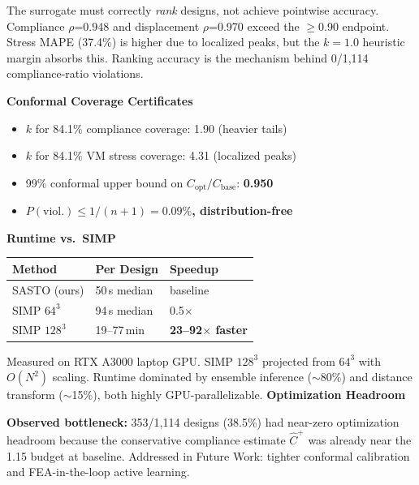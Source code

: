 \documentclass[10pt]{article}
\newenvironment{ccard}{%
  \begin{tcolorbox}[
    colback=cardfill, colframe=cardbdr,
    boxrule=0.5pt, arc=4pt, outer arc=4pt,
    left=3.5mm, right=3.5mm, top=2.5mm, bottom=2.5mm,
    width=\linewidth
  ]%
}{%
  \end{tcolorbox}%
}
\newcommand{\sub}[1]{%
  {\color{secbar}\bfseries\large #1}\par\vspace{1mm}}
\newlength{\RC}  \setlength{\RC} {29.72cm}
\newlength{\SG}  \setlength{\SG} {1.5mm}
\begin{document}
\begin{minipage}[t]{\RC}
\begin{ccard}
  \small\vspace{1mm}
  The surrogate must correctly \textit{rank} designs, not achieve pointwise
  accuracy. Compliance $\rho$=0.948 and displacement $\rho$=0.970 exceed
  the $\geq$0.90 endpoint. Stress MAPE (37.4\%) is higher due to localized
  peaks, but the $k{=}1.0$ heuristic margin absorbs this. Ranking
  accuracy is the mechanism behind 0/1,114 compliance-ratio violations.

  \vspace{3mm}
  \sub{Conformal Coverage Certificates}
  \begin{itemize}[leftmargin=1.2em, itemsep=2pt, topsep=0pt]
    \item $k$ for 84.1\% compliance coverage: 1.90 (heavier tails)
    \item $k$ for 84.1\% VM stress coverage: 4.31 (localized peaks)
    \item 99\% conformal upper bound on $C_\text{opt}/C_\text{base}$:
      \textbf{0.950}
    \item {\color{teal}\bfseries $P(\text{viol.})\leq 1/(n{+}1)=0.09\%$,
      distribution-free}
  \end{itemize}

  \vspace{3mm}
  \sub{Runtime vs.\ SIMP}
  {\small
  \begin{tabular}{@{}lll@{}}
    \rowcolor{secbar}
    \color{white}\bfseries Method &
    \color{white}\bfseries Per Design &
    \color{white}\bfseries Speedup \\\midrule
    SASTO (ours)  & 50\,s median  & baseline \\
    \rowcolor{altrow}
    SIMP $64^3$   & 94\,s median  & 0.5$\times$ \\
    SIMP $128^3$  & 19--77\,min   & \textbf{23--92$\times$ faster} \\
  \end{tabular}}

  \small\vspace{1mm}
  Measured on RTX A3000 laptop GPU. SIMP $128^3$ projected from $64^3$
  with $O(N^2)$ scaling. Runtime dominated by ensemble inference
  (${\sim}$80\%) and distance transform (${\sim}$15\%), both highly
  GPU-parallelizable.
  \vspace{3mm}
  \sub{Optimization Headroom}
  \begin{tcolorbox}[colback=posterred!8,colframe=posterred,arc=3pt,
    left=2mm,right=2mm,top=1.5mm,bottom=1.5mm,width=\linewidth]
    \small\color{txtdark}
    \textbf{Observed bottleneck:} 353/1,114 designs (38.5\%) had
    near-zero optimization headroom because the conservative compliance
    estimate $\hat{C}^+$ was already near the 1.15 budget at baseline.
    Addressed in Future Work: tighter conformal calibration and
    FEA-in-the-loop active learning.
  \end{tcolorbox}\end{ccard}
\vspace{\SG}


\end{minipage}
\end{document}
